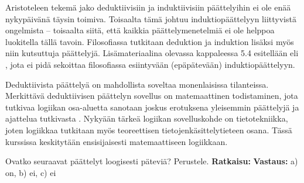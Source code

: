 Aristoteleen tekemä jako deduktiivisiin ja induktiivisiin päättelyihin ei ole enää nykypäivänä täysin toimiva. Toisaalta tämä johtuu induktiopäättelyyn liittyvistä ongelmista – toisaalta siitä, että kaikkia päättelymenetelmiä ei ole helppoa luokitella tällä tavoin. Filosofiassa tutkitaan deduktion ja induktion lisäksi myös niin kutsuttuja  päättelyjä. Lisämateriaalina olevassa kappaleessa 5.4 esitellään  eli
, jota ei pidä sekoittaa filosofiassa esiintyvään (epäpätevään) induktiopäättelyyn.

Deduktiivista päättelyä on mahdollista soveltaa monenlaisissa tilanteissa. Merkittävä deduktiivisen päättelyn sovellus on matemaattinen todistaminen, jota tutkivaa logiikan osa-aluetta sanotaan joskus  erotuksena yleisemmin päättelyjä ja ajattelua tutkivasta . Nykyään tärkeä logiikan sovelluskohde on tietotekniikka, joten logiikkaa tutkitaan myös teoreettisen tietojen\-käsittely\-tieteen osana. Tässä kurssissa keskitytään ensisijaisesti matemaattiseen logiikkaan.

\begin{esimerkki} Ovatko seuraavat päättelyt loogisesti päteviä? Perustele.
    \textbf{Ratkaisu:}
    \textbf{Vastaus:}
        a) on, b) ei, c) ei
\end{esimerkki}


